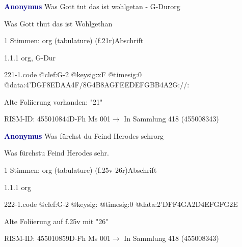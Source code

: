 \documentclass[twocolumn, 12pt]{book}
\begin{document}
\par \vspace{16pt} \textcolor{darkblue}{\textbf{Anonymus  }}\hfillplus{\textbf{[221]}}\newline Was Gott tut das ist wohlgetan - G-Dur\newline org
\par \begin{itshape} Was Gott thut das ist Wohlgethan\end{itshape} 
\par \textcolor{darkblue}{}  1 Stimmen: org (tabulature)  (f.21r)\newline Abschrift
\par 1.1.1  org, G-Dur  
\begin{filecontents*}{221-1.code}
@clef:G-2
@keysig:xF
@timesig:0
@data:4'DGF{8ED}{AA}4F/8G4B8A{GFEE}{DEFG}{BB}4A2G://:
\end{filecontents*}
\newline %
\par Alte Foliierung vorhanden: "21"
\par RISM-ID: 455010844\newline D-Fh  Ms 001\newline $\rightarrow$ In Sammlung 418 (455008343)
      
\par \vspace{16pt} \textcolor{darkblue}{\textbf{Anonymus  }}\hfillplus{\textbf{[222]}}\newline Was fürchst du Feind Herodes sehr\newline org
\par \begin{itshape}[f.25v, at left:] Was fürchstu Feind Herodes sehr.\end{itshape} 
\par \textcolor{darkblue}{}  1 Stimmen: org (tabulature)  (f.25v-26r)\newline Abschrift
\par 1.1.1  org  
\begin{filecontents*}{222-1.code}
@clef:G-2
@keysig:
@timesig:0
@data:2'DFF4GA2D4EFGFG2E
\end{filecontents*}
\newline %
\par Alte Foliierung auf f.25v mit "26"
\par RISM-ID: 455010859\newline D-Fh  Ms 001\newline $\rightarrow$ In Sammlung 418 (455008343)
      
\end{document}
